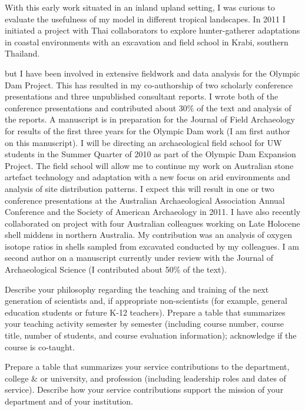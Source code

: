 \documentclass[11pt,article,oneside]{memoir}
\begin{document}
With this early work situated in an inland upland setting, I was curious to evaluate the usefulness of my model in different tropical landscapes. In 2011 I initiated a project with Thai collaborators to explore hunter-gatherer adaptations in coastal environments with an excavation and field school in Krabi, southern Thailand. 


but I have been involved in extensive fieldwork and data analysis for the Olympic Dam Project. This has resulted in my co-authorship of two scholarly conference presentations and three unpublished consultant reports. I wrote both of the conference presentations and contributed about 30\% of the text and analysis of the reports. A manuscript is in preparation for the Journal of Field Archaeology for results of the first three years for the Olympic Dam work (I am first author on this manuscript). I will be directing an archaeological field school for UW students in the Summer Quarter of 2010 as part of the Olympic Dam Expansion Project. The field school will allow me to continue my work on Australian stone artefact technology and adaptation with a new focus on arid environments and analysis of site distribution patterns. I expect this will result in one or two conference presentations at the Australian Archaeological Association Annual Conference and the Society of American Archaeology in 2011. I have also recently collaborated on project with four Australian colleagues working on Late Holocene shell middens in northern Australia. My contribution was an analysis of oxygen isotope ratios in shells sampled from excavated conducted by my colleagues. I am second author on a manuscript currently under review with the Journal of Archaeological Science (I contributed about 50\% of the text). 


\bigskip     


Describe your philosophy regarding the teaching and training of the next generation of scientists and, if appropriate non-scientists (for example, general education students or future K-12 teachers). Prepare a table that summarizes your teaching activity semester by semester (including course number, course title, number of students, and course evaluation information); acknowledge if the course is co-taught.

\bigskip     


Prepare a table that summarizes your service contributions to the department, college \& or university, and profession (including leadership roles and dates of service). Describe how your service contributions support the mission of your department and of your institution.
\end{document}
